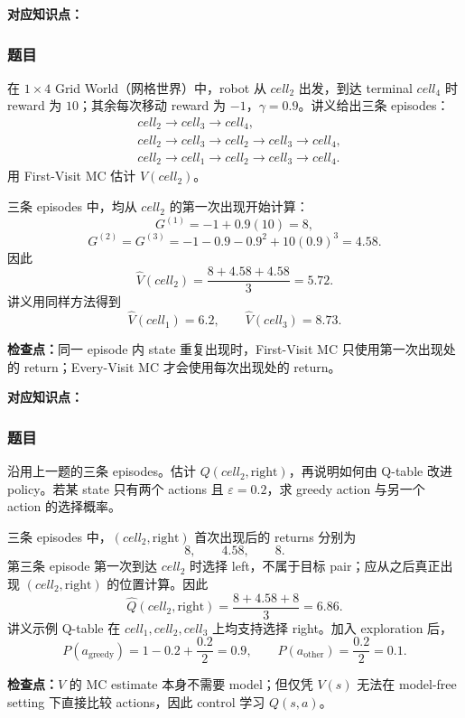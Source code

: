 \textbf{对应知识点：}

\subsubsection*{题目}

在 $1\times4$ Grid World（网格世界）中，robot 从 $cell_2$ 出发，到达 terminal $cell_4$ 时 reward 为 $10$；其余每次移动 reward 为 $-1$，$\gamma=0.9$。讲义给出三条 episodes：
\[
  \begin{aligned}
    &cell_2\to cell_3\to cell_4,\\
    &cell_2\to cell_3\to cell_2\to cell_3\to cell_4,\\
    &cell_2\to cell_1\to cell_2\to cell_3\to cell_4.
  \end{aligned}
\]
用 First-Visit MC 估计 $V(cell_2)$。

\begin{checkedsolution}
三条 episodes 中，均从 $cell_2$ 的第一次出现开始计算：
\[
  G^{(1)}=-1+0.9(10)=8,
\]
\[
  G^{(2)}=G^{(3)}
  =-1-0.9-0.9^2+10(0.9)^3
  =4.58.
\]
因此
\[
  \widehat V(cell_2)
  =\frac{8+4.58+4.58}{3}
  =\boxed{5.72}.
\]
讲义用同样方法得到
\[
  \widehat V(cell_1)=6.2,
  \qquad \widehat V(cell_3)=8.73.
\]
\end{checkedsolution}

\textbf{检查点：}同一 episode 内 state 重复出现时，First-Visit MC 只使用第一次出现处的 return；Every-Visit MC 才会使用每次出现处的 return。

\clearpage
{}

\textbf{对应知识点：}

\subsubsection*{题目}

沿用上一题的三条 episodes。估计 $Q(cell_2,\text{right})$，再说明如何由 Q-table 改进 policy。若某 state 只有两个 actions 且 $\varepsilon=0.2$，求 greedy action 与另一个 action 的选择概率。

\begin{checkedsolution}
三条 episodes 中，$(cell_2,\text{right})$ 首次出现后的 returns 分别为
\[
  8,\qquad 4.58,\qquad 8.
\]
第三条 episode 第一次到达 $cell_2$ 时选择 left，不属于目标 pair；应从之后真正出现 $(cell_2,\text{right})$ 的位置计算。因此
\[
  \widehat Q(cell_2,\text{right})
  =\frac{8+4.58+8}{3}
  =\boxed{6.86}.
\]
讲义示例 Q-table 在 $cell_1,cell_2,cell_3$ 上均支持选择 right。加入 exploration 后，
\[
  P(a_{\mathrm{greedy}})=1-0.2+\frac{0.2}{2}=\boxed{0.9},
  \qquad
  P(a_{\mathrm{other}})=\frac{0.2}{2}=\boxed{0.1}.
\]
\end{checkedsolution}

\textbf{检查点：}$V$ 的 MC estimate 本身不需要 model；但仅凭 $V(s)$ 无法在 model-free setting 下直接比较 actions，因此 control 学习 $Q(s,a)$。
